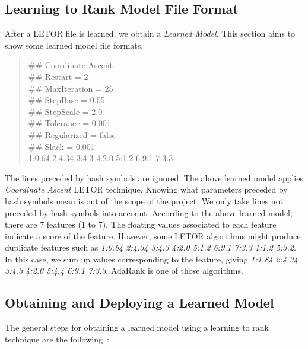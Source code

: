 \subsection{Learning to Rank Model File Format} \label{sec:learnedmodelFile}
After a LETOR file is learned, we obtain a \textit{Learned Model}. This section aims to show some learned model file formats.
\begin{quotation}
\noindent \#\# Coordinate Ascent \\
\#\# Restart = 2 \\
\#\# MaxIteration = 25 \\
\#\# StepBase = 0.05 \\
\#\# StepScale = 2.0 \\
\#\# Tolerance = 0.001 \\
\#\# Regularized = false \\
\#\# Slack = 0.001 \\
1:0.64 2:4.34 3:4.3 4:2.0 5:1.2 6:9.1 7:3.3
\end{quotation}
The lines preceded by hash symbols are ignored. The above learned model applies \textit{Coordinate Ascent} LETOR technique. Knowing what parameters preceded by hash symbols
mean is out of the scope of the project. We only take lines not preceded by hash symbols into account. According to the above learned model, there are
7 features (1 to 7). The floating values associated to each feature indicate a score of the feature. However, some LETOR algorithms might produce
duplicate features such as \textit{1:0.64 2:4.34 3:4.3 4:2.0 5:1.2 6:9.1 7:3.3 1:1.2 5:3.2}. In this case, we sum up values corresponding
to the feature, giving \textit{1:1.84 2:4.34 3:4.3 4:2.0 5:4.4 6:9.1 7:3.3}. AdaRank is one of those algorithms.


\subsection{Obtaining and Deploying a Learned Model} \label{sec:learnedmodel}
The general steps for obtaining a learned model using a learning to rank technique are the following~\cite[P. 4]{learningmodel}:


